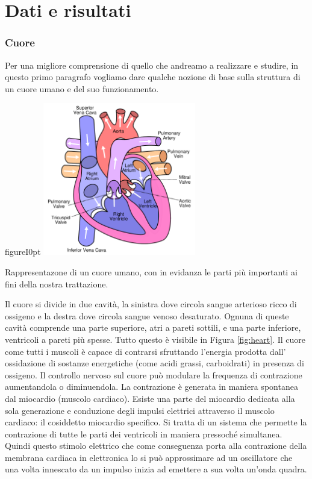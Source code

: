 \section*{Dati e risultati}

\subsubsection*{Cuore}

Per una migliore comprensione di quello che andreamo a realizzare e studire, in questo primo paragrafo vogliamo dare qualche nozione di base sulla struttura di un cuore umano e del suo funzionamento.

\begin{wrapfloat}{figure}{I}{0pt}
	\includegraphics[width=0.5\textwidth]{figure/heart.pdf}
	\caption{Rappresentazone di un cuore umano, con in evidanza le parti più importanti ai fini della nostra trattazione.}
	\label{fig:heart}
\end{wrapfloat}

Il cuore si divide in due cavità, la sinistra dove circola sangue arterioso ricco di ossigeno e la destra dove circola sangue venoso desaturato. Ognuna di queste cavità comprende una parte superiore, atri a pareti sottili, e una parte inferiore, ventricoli a pareti più spesse. Tutto questo è visibile in Figura \ref{fig:heart}.
Il cuore come tutti i muscoli è capace di contrarsi sfruttando l'energia prodotta dall' ossidazione di sostanze energetiche (come acidi grassi, carboidrati) in presenza di ossigeno. 
Il controllo nervoso sul cuore può modulare la frequenza di contrazione aumentandola o diminuendola. La contrazione è generata in maniera spontanea dal miocardio (muscolo cardiaco).
Esiste una parte del miocardio dedicata alla sola generazione e conduzione degli impulsi elettrici attraverso il muscolo cardiaco: il cosiddetto miocardio specifico. Si tratta di un sistema che permette la contrazione di tutte le parti dei ventricoli in maniera pressoché simultanea.
Quindi questo stimolo elettrico che come conseguenza porta alla contrazione della membrana cardiaca in elettronica lo si può approssimare ad un oscillatore che una volta innescato da un impulso inizia ad emettere a sua volta un’onda quadra.

